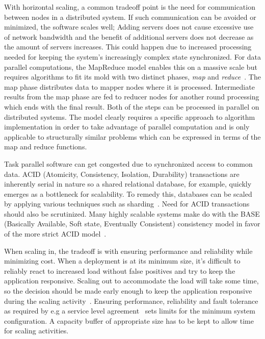 \documentclass[english]{tktltiki2}
\theoremstyle{definition}
\theoremstyle{remark}
\begin{document}
With horizontal scaling, a common tradeoff point is the need for communication
between nodes in a distributed system. If such communication can be avoided or
minimized, the software scales well; Adding servers does not cause excessive use
of network bandwidth and the benefit of additional servers does not decrease as
the amount of servers increases. This could happen due to increased processing
needed for keeping the system's increasingly complex state synchronized. For
data parallel computations, the MapReduce model enables this on a massive scale
but requires algorithms to fit its mold with two distinct phases, \emph{map} and
\emph{reduce}~\cite{handbook-mapreduce}. The map phase distributes data to
mapper nodes where it is processed. Intermediate results from the map phase are
fed to reducer nodes for another round processing which ends with the final
result. Both of the steps can be processed in parallel on distributed systems.
The model clearly requires a specific approach to algorithm implementation in
order to take advantage of parallel computation and is only applicable to
structurally similar problems which can be expressed in terms of the map and
reduce functions.

Task parallel software can get congested due to synchronized access to common
data. ACID (Atomicity, Consistency, Isolation, Durability) transactions are
inherently serial in nature so a shared relational database, for example,
quickly emerges as a bottleneck for scalability. To remedy this, databases can
be scaled by applying various techniques such as
sharding~\cite{scalableDataStores}. Need for ACID transactions should also be
scrutinized. Many highly scalable systems make do with the BASE (Basically
Available, Soft state, Eventually Consistent) consistency model in favor of the
more strict ACID model~\cite{tivitbestpractices}\cite{VRB11}\cite{Buyya2010intercloud}.

When scaling in, the tradeoff is with ensuring performance and
reliability while minimizing cost. When a deployment is at its minimum size,
it’s difficult to reliably react to increased load without false positives and
try to keep the application responsive. Scaling out to accommodate the
load will take some time, so the decision should be made early enough to keep
the application responsive during the scaling activity~\cite{Roy2011}. Ensuring
performance, reliability and fault tolerance as required by e.g a service level
agreement~\cite{Funika2011}\cite{Iqbal2011} sets limits for the minimum system
configuration. A capacity buffer of appropriate size has to be kept to allow
time for scaling activities.
\end{document}
